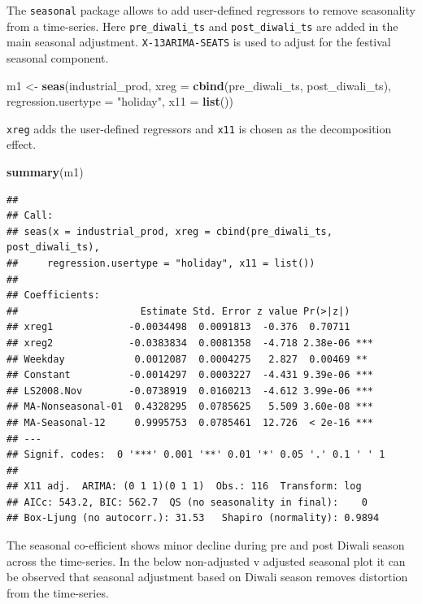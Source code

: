 \documentclass[
]{article}
\newenvironment{Shaded}{\begin{snugshade}}{\end{snugshade}}
\newcommand{\AttributeTok}[1]{\textcolor[rgb]{0.13,0.29,0.53}{#1}}
\newcommand{\FunctionTok}[1]{\textcolor[rgb]{0.13,0.29,0.53}{\textbf{#1}}}
\newcommand{\NormalTok}[1]{#1}
\newcommand{\OtherTok}[1]{\textcolor[rgb]{0.56,0.35,0.01}{#1}}
\newcommand{\StringTok}[1]{\textcolor[rgb]{0.31,0.60,0.02}{#1}}
\begin{document}
The \texttt{seasonal} package allows to add user-defined regressors to
remove seasonality from a time-series. Here \texttt{pre\_diwali\_ts} and
\texttt{post\_diwali\_ts} are added in the main seasonal adjustment.
\texttt{X-13ARIMA-SEATS} is used to adjust for the festival seasonal
component.

\begin{Shaded}
\begin{Highlighting}[]
\NormalTok{m1 }\OtherTok{\textless{}{-}} \FunctionTok{seas}\NormalTok{(industrial\_prod, }\AttributeTok{xreg =} \FunctionTok{cbind}\NormalTok{(pre\_diwali\_ts, post\_diwali\_ts), }\AttributeTok{regression.usertype =} \StringTok{"holiday"}\NormalTok{, }\AttributeTok{x11 =} \FunctionTok{list}\NormalTok{())}
\end{Highlighting}
\end{Shaded}

\texttt{xreg} adds the user-defined regressors and \texttt{x11} is
chosen as the decomposition effect.

\begin{Shaded}
\begin{Highlighting}[]
\FunctionTok{summary}\NormalTok{(m1)}
\end{Highlighting}
\end{Shaded}

\begin{verbatim}
## 
## Call:
## seas(x = industrial_prod, xreg = cbind(pre_diwali_ts, post_diwali_ts), 
##     regression.usertype = "holiday", x11 = list())
## 
## Coefficients:
##                     Estimate Std. Error z value Pr(>|z|)    
## xreg1             -0.0034498  0.0091813  -0.376  0.70711    
## xreg2             -0.0383834  0.0081358  -4.718 2.38e-06 ***
## Weekday            0.0012087  0.0004275   2.827  0.00469 ** 
## Constant          -0.0014297  0.0003227  -4.431 9.39e-06 ***
## LS2008.Nov        -0.0738919  0.0160213  -4.612 3.99e-06 ***
## MA-Nonseasonal-01  0.4328295  0.0785625   5.509 3.60e-08 ***
## MA-Seasonal-12     0.9995753  0.0785461  12.726  < 2e-16 ***
## ---
## Signif. codes:  0 '***' 0.001 '**' 0.01 '*' 0.05 '.' 0.1 ' ' 1
## 
## X11 adj.  ARIMA: (0 1 1)(0 1 1)  Obs.: 116  Transform: log
## AICc: 543.2, BIC: 562.7  QS (no seasonality in final):    0  
## Box-Ljung (no autocorr.): 31.53   Shapiro (normality): 0.9894
\end{verbatim}

The seasonal co-efficient shows minor decline during pre and post Diwali
season across the time-series. In the below non-adjusted v adjusted
seasonal plot it can be observed that seasonal adjustment based on
Diwali season removes distortion from the time-series.
\end{document}
